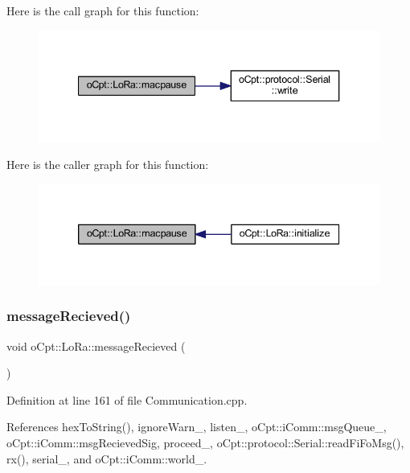 Here is the call graph for this function\+:\nopagebreak
\begin{figure}[H]
\begin{center}
\leavevmode
\includegraphics[width=340pt]{classo_cpt_1_1_lo_ra_ac1042fa7b446ce798317a529b6425a4f_cgraph}
\end{center}
\end{figure}
Here is the caller graph for this function\+:\nopagebreak
\begin{figure}[H]
\begin{center}
\leavevmode
\includegraphics[width=339pt]{classo_cpt_1_1_lo_ra_ac1042fa7b446ce798317a529b6425a4f_icgraph}
\end{center}
\end{figure}
\hypertarget{classo_cpt_1_1_lo_ra_a606eeaec7fb73b483f958005444246b4}{}\label{classo_cpt_1_1_lo_ra_a606eeaec7fb73b483f958005444246b4} 
\subsubsection{\texorpdfstring{message\+Recieved()}{messageRecieved()}}
{\footnotesize\ttfamily void o\+Cpt\+::\+Lo\+Ra\+::message\+Recieved (\begin{DoxyParamCaption}{ }\end{DoxyParamCaption})\hspace{0.3cm}{\ttfamily [protected]}}



Definition at line 161 of file Communication.\+cpp.



References hex\+To\+String(), ignore\+Warn\+\_\+, listen\+\_\+, o\+Cpt\+::i\+Comm\+::msg\+Queue\+\_\+, o\+Cpt\+::i\+Comm\+::msg\+Recieved\+Sig, proceed\+\_\+, o\+Cpt\+::protocol\+::\+Serial\+::read\+Fi\+Fo\+Msg(), rx(), serial\+\_\+, and o\+Cpt\+::i\+Comm\+::world\+\_\+.



